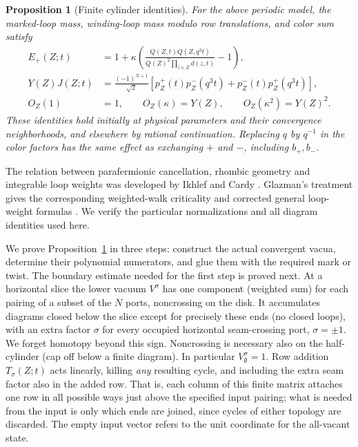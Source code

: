\documentclass[11pt]{article}
\numberwithin{equation}{section}
\newtheorem{proposition}[theorem]{Proposition}
\theoremstyle{definition}\newtheorem{definition}[theorem]{Definition}
\theoremstyle{remark}\newtheorem{remark}[theorem]{Remark}
\begin{document}
\begin{proposition}[Finite cylinder identities]\label{L:prop:periodic}
For the above periodic model, the marked-loop mass, winding-loop mass
modulo row translations, and color sum satisfy
\begin{align}
 E_+(Z;t)&=1+\kappa\left(\frac{Q(Z,t)Q(Z,q^3t)}
 {Q(Z)^2\prod_{z\in Z}d(z,t)}-1\right),\label{L:eq:one-port}\\
 Y(Z)J(Z;t)&=\frac{(-1)^{N+1}}{\sqrt2}
 [p_Z^+(t)p_Z^-(q^3t)+p_Z^-(t)p_Z^+(q^3t)],\label{L:eq:winding}\\
 O_Z(1)&=1,\qquad O_Z(\kappa)=Y(Z),\qquad
 O_Z(\kappa^2)=Y(Z)^2.\label{L:eq:color-values}
\end{align}
These identities hold initially at physical parameters and their
convergence neighborhoods, and elsewhere by rational continuation.
Replacing $q$ by $q^{-1}$ in the color factors has the same effect as
exchanging $+$ and $-$, including $b_+,b_-$.
\end{proposition}

The relation between parafermionic cancellation, rhombic geometry and
integrable loop weights was developed by Ikhlef and Cardy
\cite{IkhlefCardy2009}. Glazman's treatment gives the corresponding
weighted-walk criticality and corrected general loop-weight formulas
\cite[Theorems~1.1--1.2 and Section~5]{Glazman2015}. We verify the particular normalizations and
all diagram identities used here.

We prove Proposition~\ref{L:prop:periodic} in three steps: construct the actual convergent vacua, determine their polynomial numerators, and glue them with the required mark or twist. The boundary estimate needed for the first step is proved next. At a horizontal slice the lower vacuum \(V^\sigma\) has one component (weighted sum) for each pairing of a subset of the \(N\) ports, noncrossing on the disk. It accumulates diagrams closed below the slice except for precisely these ends (no closed loops), with an extra factor \(\sigma\) for every occupied horizontal seam-crossing port, \(\sigma=\pm1\). We forget homotopy beyond this sign. Noncrossing is necessary also on the half-cylinder (cap off below a finite diagram). In particular \(V^\sigma_\emptyset=1\). Row addition \(T_\sigma(Z;t)\) acts linearly, killing \emph{any} resulting cycle, and including the extra seam factor also in the added row. That is, each column of this finite matrix attaches one row in all possible ways just above the specified input pairing; what is needed from the input is only which ends are joined, since cycles of either topology are discarded. The empty input vector refers to the unit coordinate for the all-vacant state.
\end{document}
